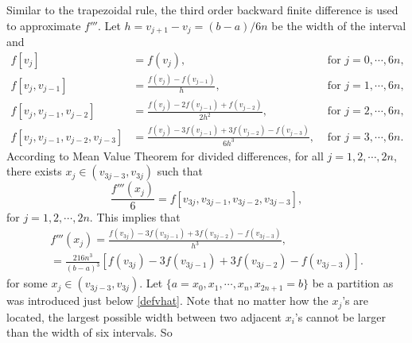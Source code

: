 \documentclass{iitthesis}
\DeclareMathOperator{\Var}{Var}
\theoremstyle{definition}
\theoremstyle{remark}
\begin{document}
Similar to the trapezoidal rule, the third order backward finite difference is used to approximate $f'''$. Let $h=v_{j+1}-v_{j}=(b-a)/6n$ be the width of the interval and
\begin{align*}
  f[v_{j}]&=f(v_{j}), &\text{ for } j=0,\cdots, 6n,\\
  f[v_{j},v_{j-1}]&=\frac{f(v_{j})-f(v_{j-1})}{h},&\text{ for } j=1, \cdots, 6n,\\
  f[v_{j},v_{j-1},v_{j-2}]&=\frac{f(v_{j})-2f(v_{j-1})+f(v_{j-2})}{2h^2},&\text{ for } j=2, \cdots, 6n,\\
  f[v_{j},v_{j-1},v_{j-2},v_{j-3}]&=\frac{f(v_{j})-3f(v_{j-1})+3f(v_{j-2})-f(v_{j-3})}{6h^3}, &\text{ for } j=3, \cdots, 6n.
\end{align*}
According to Mean Value Theorem for divided differences, for all $j=1,2,\cdots,2n$, there exists $x_j\in (v_{3j-3},v_{3j})$ such that
\begin{equation*}
    \frac{f'''(x_j)}{6}=f[v_{3j},v_{3j-1},v_{3j-2},v_{3j-3}],
\end{equation*}
for $j = 1, 2, \cdots, 2n.$ This implies that
\begin{multline}\label{ftriprime}
  f'''(x_j)=\frac{f(v_{3j})-3f(v_{3j-1})+3f(v_{3j-2})-f(v_{3j-3})}{h^3},\\=\frac{216n^3}{(b-a)^3}[f(v_{3j})-3f(v_{3j-1})+3f(v_{3j-2})-f(v_{3j-3})].
\end{multline}
for some $x_j\in (v_{3j-3},v_{3j})$. Let $\{a=x_{0}, x_{1},\cdots,x_{n},x_{2n+1}=b\}$ be a partition as was introduced just below \eqref{defvhat}. Note that no matter how the $x_j$'s are located, the largest possible width between two adjacent $x_{i}$'s cannot be larger than the width of six intervals. So
\end{document}
